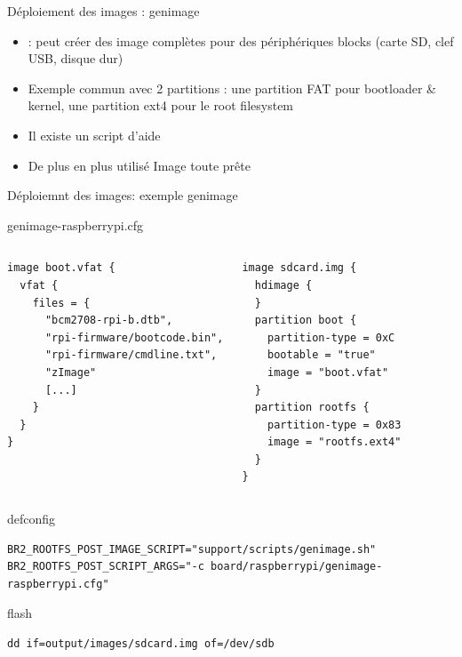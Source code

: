 \documentclass[aspectratio=169,obeyspaces,spaces,hyphens,dvipsnames]{beamer}
\begin{document}
\begin{frame}{Déploiement des images : genimage}
  \begin{itemize}
  \item {} : peut créer des image complètes pour des périphériques
    blocks (carte SD, clef USB, disque dur)
  \item Exemple commun avec 2 partitions : une partition FAT
    pour bootloader \& kernel, une partition ext4 pour le root filesystem
  \item Il existe un script d'aide 
  \item De plus en plus utilisé \MVRightarrow Image toute prête
  \end{itemize}
\end{frame}

\begin{frame}[fragile]{Déploiemnt des images: exemple genimage}
\begin{block}{genimage-raspberrypi.cfg}
\begin{columns}
{\tiny
  \begin{verbatim}
image boot.vfat {
  vfat {
    files = {
      "bcm2708-rpi-b.dtb",
      "rpi-firmware/bootcode.bin",
      "rpi-firmware/cmdline.txt",
      "zImage"
      [...]
    }
  }
}
\end{verbatim}
}
{\tiny
\begin{verbatim}
image sdcard.img {
  hdimage {
  }
  partition boot {
    partition-type = 0xC
    bootable = "true"
    image = "boot.vfat"
  }
  partition rootfs {
    partition-type = 0x83
    image = "rootfs.ext4"
  }
}
 \end{verbatim}
}
\end{columns}
\end{block}
\begin{block}{defconfig}
{\tiny
  \begin{verbatim}
BR2_ROOTFS_POST_IMAGE_SCRIPT="support/scripts/genimage.sh"
BR2_ROOTFS_POST_SCRIPT_ARGS="-c board/raspberrypi/genimage-raspberrypi.cfg"
\end{verbatim}
}
\end{block}
\begin{block}{flash}
{\tiny
  \begin{verbatim}
dd if=output/images/sdcard.img of=/dev/sdb
\end{verbatim}
}
\end{block}
\end{frame}
\end{document}
